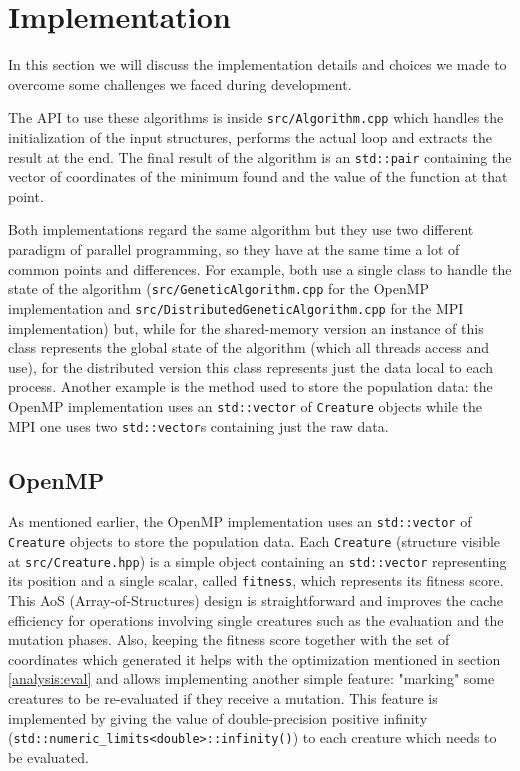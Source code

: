 \documentclass[12pt,a4paper,oneside]{article}
\begin{document}
	\clearpage
	\section{Implementation}
	In this section we will discuss the implementation details and choices we made to overcome some challenges we faced during development.

	The API to use these algorithms is inside \texttt{src/Algorithm.cpp} which handles the initialization of the input structures, performs the actual loop and extracts the result at the end.
	The final result of the algorithm is an \texttt{std::pair} containing the vector of coordinates of the minimum found and the value of the function at that point.

	Both implementations regard the same algorithm but they use two different paradigm of parallel programming, so they have at the same time a lot of common points and differences.
	For example, both use a single class to handle the state of the algorithm (\texttt{src/GeneticAlgorithm.cpp} for the OpenMP implementation and \texttt{src/DistributedGeneticAlgorithm.cpp} for the MPI implementation) but, while for the shared-memory version an instance of this class represents the global state of the algorithm (which all threads access and use), for the distributed version this class represents just the data local to each process.
	Another example is the method used to store the population data: the OpenMP implementation uses an \texttt{std::vector} of \texttt{Creature} objects while the MPI one uses two \texttt{std::vector}s containing just the raw data.

	\subsection{OpenMP}
	As mentioned earlier, the OpenMP implementation uses an \texttt{std::vector} of \texttt{Creature} objects to store the population data.
	Each \texttt{Creature} (structure visible at \texttt{src/Creature.hpp}) is a simple object containing an \texttt{std::vector} representing its position and a single scalar, called \texttt{fitness}, which represents its fitness score.
	This AoS (Array-of-Structures) design is straightforward and improves the cache efficiency for operations involving single creatures such as the evaluation and the mutation phases.
	Also, keeping the fitness score together with the set of coordinates which generated it helps with the optimization mentioned in section \ref{analysis:eval} and allows implementing another simple feature: "marking" some creatures to be re-evaluated if they receive a mutation.
	This feature is implemented by giving the value of double-precision positive infinity (\texttt{std::numeric\_limits<double>::infinity()}) to each creature which needs to be evaluated.
\end{document}
